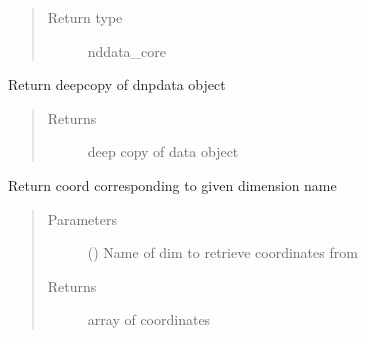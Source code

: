 \documentclass[letterpaper,10pt,english]{sphinxmanual}
\begin{document}
\begin{fulllineitems}
\begin{fulllineitems}
\begin{quote}
\begin{description}
\item[{Return type}] \leavevmode
nddata\_core

\end{description}\end{quote}

\end{fulllineitems}


\begin{fulllineitems}
\label{\detokenize{dnpData:dnpLab.dnpdata.concatenate}}
\end{fulllineitems}


\begin{fulllineitems}
\label{\detokenize{dnpData:dnpLab.dnpdata.copy}}
Return deepcopy of dnpdata object
\begin{quote}\begin{description}
\item[{Returns}] \leavevmode
deep copy of data object

\end{description}\end{quote}

\end{fulllineitems}


\begin{fulllineitems}
\label{\detokenize{dnpData:dnpLab.dnpdata.get_coord}}
Return coord corresponding to given dimension name
\begin{quote}\begin{description}
\item[{Parameters}] \leavevmode
{} () \sphinxhyphen{}\sphinxhyphen{} Name of dim to retrieve coordinates from

\item[{Returns}] \leavevmode
array of coordinates


\end{description}
\end{quote}
\end{fulllineitems}
\end{fulllineitems}
\end{document}
